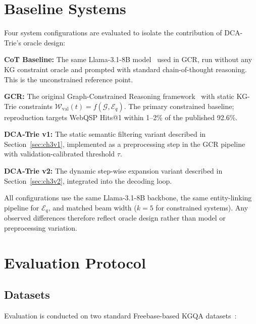 \section{Baseline Systems}
\label{sec:ch3baseline}

Four system configurations are evaluated to isolate the contribution of DCA-Trie's oracle design:

\textbf{CoT Baseline:} The same Llama-3.1-8B model~\citep{dubey2024llama3} used in GCR, run without any KG constraint oracle and prompted with standard chain-of-thought reasoning. This is the unconstrained reference point.

\textbf{GCR:} The original Graph-Constrained Reasoning framework~\citep{luo2025-graph-constrained-reasoning} with static KG-Trie constraints $\mathcal{W}_{\text{val}}(t)=f(\mathcal{G},\mathcal{E}_q)$. The primary constrained baseline; reproduction targets WebQSP Hits@1 within 1--2\% of the published 92.6\%.

\textbf{DCA-Trie v1:} The static semantic filtering variant described in Section~\ref{sec:ch3v1}, implemented as a preprocessing step in the GCR pipeline with validation-calibrated threshold $\tau$.

\textbf{DCA-Trie v2:} The dynamic step-wise expansion variant described in Section~\ref{sec:ch3v2}, integrated into the decoding loop.

All configurations use the same Llama-3.1-8B backbone, the same entity-linking pipeline for $\mathcal{E}_q$, and matched beam width ($k=5$ for constrained systems). Any observed differences therefore reflect oracle design rather than model or preprocessing variation.

\section{Evaluation Protocol}
\label{sec:ch3eval}

\subsection{Datasets}

Evaluation is conducted on two standard Freebase-based KGQA datasets~\citep{bollacker2008freebase}:

